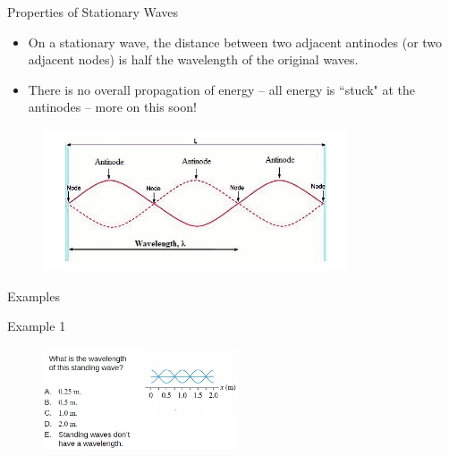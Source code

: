 \documentclass[../Main.tex]{subfiles}
\begin{document}
\begin{frame}{Properties of Stationary Waves}
\begin{itemize}
    \item On a stationary wave, the distance between two adjacent antinodes (or two adjacent nodes) is half the wavelength of the original waves.
    \item There is no overall propagation of energy -- all energy is ``stuck" at the antinodes -- more on this soon!
\end{itemize}
\begin{figure}
    \centering
    \includegraphics[width=9cm]{Waves_Images/Stationary-wave.png}
\end{figure}
\end{frame}

\begin{frame}{Examples}
    \begin{exampleblock}{Example 1}
    \begin{figure}
        \centering
        \includegraphics[height=3cm]{Waves_Images/stationarywave_mcq.jpg}
    \end{figure}
    \end{exampleblock}
\end{frame}
\end{document}
